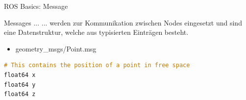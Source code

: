 \documentclass{beamer}
\begin{document}
\begin{frame}[fragile]{ROS Basics: Message}
\begin{alertblock}{Messages ...}
... werden zur Kommunikation zwischen Nodes eingesetzt und sind eine Datenstruktur, welche aus typisierten Eintr\"agen besteht.
\end{alertblock}
\vspace{20px}
\begin{itemize}
	\item geometry\_msgs/Point.msg
\end{itemize}
\begin{lstlisting}[frame=single, language=C]
# This contains the position of a point in free space
float64 x
float64 y
float64 z
\end{lstlisting}
\end{frame}
\end{document}
